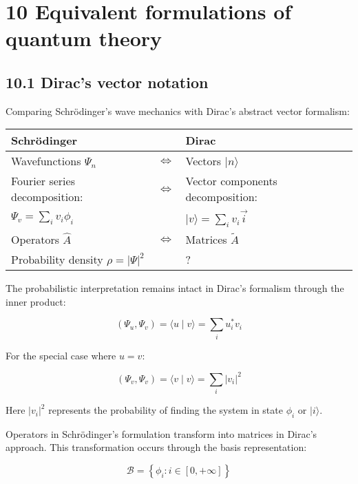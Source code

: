 \documentclass[10pt]{article}
\begin{document}
\section*{10 Equivalent formulations of quantum theory}
\subsection*{10.1 Dirac's vector notation}

Comparing Schrödinger's wave mechanics with Dirac's abstract vector formalism:

\begin{center}
\begin{tabular}{|l|l|l|}
\hline
Schrödinger &  & Dirac \\
\hline
Wavefunctions $\Psi_{n}$ & $\Longleftrightarrow$ & Vectors $|n\rangle$ \\
\hline
Fourier series decomposition: & $\Longleftrightarrow$ & Vector components decomposition: \\
\hline
$\Psi_{v}=\sum_{i} v_{i} \phi_{i}$ &  & $|v\rangle=\sum_{i} v_{i} \vec{i}$ \\
\hline
Operators $\hat{A}$ & $\Longleftrightarrow$ & Matrices $\tilde{A}$ \\
\hline
Probability density $\rho=|\Psi|^{2}$ &  & ? \\
\hline
\end{tabular}
\end{center}

The probabilistic interpretation remains intact in Dirac's formalism through the inner product:

\begin{equation*}
\left(\Psi_{u}, \Psi_{v}\right)=\langle u \mid v\rangle=\sum_{i} u_{i}^{*} v_{i} \tag{10.1}
\end{equation*}

For the special case where $u=v$:

\begin{equation*}
\left(\Psi_{v}, \Psi_{v}\right)=\langle v \mid v\rangle=\sum_{i}\left|v_{i}\right|^{2} \tag{10.2}
\end{equation*}

Here $\left|v_{i}\right|^{2}$ represents the probability of finding the system in state $\phi_{i}$ or $|i\rangle$.

Operators in Schrödinger's formulation transform into matrices in Dirac's approach. This transformation occurs through the basis representation:

\begin{equation*}
\mathcal{B}=\left\{\phi_{i}: i \in[0,+\infty]\right\} \tag{10.3}
\end{equation*}
\end{document}
